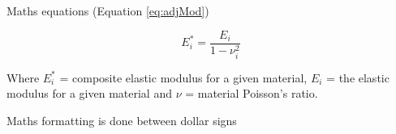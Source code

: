 

Maths equations (Equation \ref{eq:adjMod})


\begin{equation}
	\label{eq:adjMod}
	E_{i}^{*} = \frac{E_{i}}{1-\nu_{i}^{2}}
\end{equation}

Where $E_{i}^{*}$ = composite elastic modulus for a given material, $E_{i}$ = the elastic modulus for a given material and $\nu$ = material Poisson's ratio.

Maths formatting is done between dollar signs
